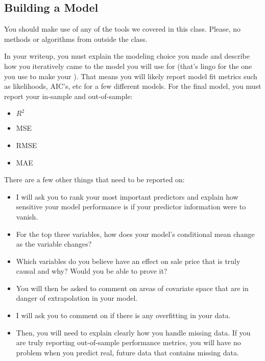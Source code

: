 \documentclass[12pt]{article}
\begin{document}
\subsection{Building a Model}

You should make use of any of the tools we covered in this class. Please, no methods or algorithms from outside the class.

In your writeup, you must explain the modeling choice you made and describe how you iteratively came to the model you will use for  (that's lingo for the one you use to make your ). That means you will likely report model fit metrics such as likelihoods, AIC's, etc for a few different models. For the final model, you must report your in-sample and out-of-sample: 

\begin{itemize}
\item $R^2$ 
\item MSE 
\item RMSE
\item MAE
\end{itemize}

There are a few other things that need to be reported on:


\begin{itemize}
\item I will ask you to rank your most important predictors and explain how sensitive your model performance is if your predictor information were to vanish.

\item For the top three variables, how does your model's conditional mean change as the variable changes?

\item Which variables do you believe have an effect on sale price that is truly causal and why? Would you be able to prove it?

\item You will then be asked to comment on areas of covariate space that are in danger of extrapolation in your model.

\item I will ask you to comment on if there is any overfitting in your data.

\item Then, you will need to explain clearly how you handle missing data. If you are truly reporting out-of-sample performance metrics, you will have no problem when you predict real, future data that contains missing data.
\end{itemize}
\end{document}
